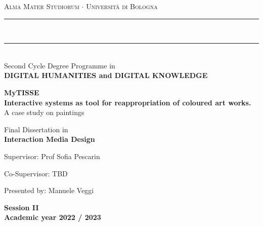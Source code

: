 \documentclass[12pt,a4paper]{article}
\begin{document}
\begin{titlepage}
\begin{center}
{{\Large{\textsc{Alma Mater Studiorum $\cdot$ Universit\`a di
Bologna}}}} 
\rule[0.1cm]{15.8cm}{0.1mm} \\
\rule[0.5cm]{15.8cm}{0.6mm} \\
Second Cycle Degree Programme in\\{\bf DIGITAL HUMANITIES and DIGITAL KNOWLEDGE}
\end{center}
\vspace{45mm}
\begin{center}
{\LARGE{\bf MyTISSE}}\\
\vspace{3mm}
{\LARGE{\bf Interactive systems as tool for reappropriation of coloured art works.}}\\
\vspace{3mm}
{\LARGE A case study on paintings}\\
\end{center}
\vspace{25mm}
\begin{center}
Final Dissertation in\\{\bf Interaction Media Design}
\end{center}
\vspace{15mm}
\par
{\noindent
Supervisor: Prof Sofia Pescarin
\vspace{3mm}
\par
\noindent
Co-Supervisor: TBD
\vspace{3mm}
\par
\noindent
Presented by: Manuele Veggi
}
\vspace{20mm}
\begin{center}
{\bf Session II\\
\vspace{2mm}
Academic year 2022 / 2023}
\end{center}
\end{titlepage}
\end{document}
